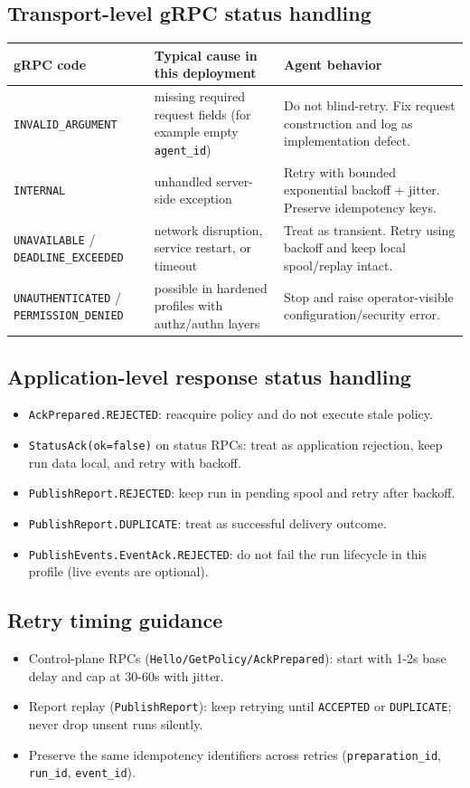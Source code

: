\documentclass[11pt,a4paper]{article}
\begin{document}
\subsection{Transport-level gRPC status handling}
\begin{longtable}{p{3.4cm}p{5.0cm}p{4.8cm}}
\textbf{gRPC code} & \textbf{Typical cause in this deployment} & \textbf{Agent behavior} \\
\hline
\endhead
\texttt{INVALID\_ARGUMENT} & missing required request fields (for example empty \texttt{agent\_id}) &
Do not blind-retry. Fix request construction and log as implementation defect. \\
\texttt{INTERNAL} & unhandled server-side exception &
Retry with bounded exponential backoff + jitter. Preserve idempotency keys. \\
\texttt{UNAVAILABLE} / \texttt{DEADLINE\_EXCEEDED} &
network disruption, service restart, or timeout &
Treat as transient. Retry using backoff and keep local spool/replay intact. \\
\texttt{UNAUTHENTICATED} / \texttt{PERMISSION\_DENIED} &
possible in hardened profiles with authz/authn layers &
Stop and raise operator-visible configuration/security error. \\
\hline
\end{longtable}

\subsection{Application-level response status handling}
\begin{itemize}
  \item \texttt{AckPrepared.REJECTED}: reacquire policy and do not execute stale policy.
  \item \texttt{StatusAck(ok=false)} on status RPCs: treat as application rejection, keep run data local, and retry with backoff.
  \item \texttt{PublishReport.REJECTED}: keep run in pending spool and retry after backoff.
  \item \texttt{PublishReport.DUPLICATE}: treat as successful delivery outcome.
  \item \texttt{PublishEvents.EventAck.REJECTED}: do not fail the run lifecycle in this profile (live events are optional).
\end{itemize}

\subsection{Retry timing guidance}
\begin{itemize}
  \item Control-plane RPCs (\texttt{Hello/GetPolicy/AckPrepared}): start with 1-2s base delay and cap at 30-60s with jitter.
  \item Report replay (\texttt{PublishReport}): keep retrying until \texttt{ACCEPTED} or \texttt{DUPLICATE}; never drop unsent runs silently.
  \item Preserve the same idempotency identifiers across retries (\texttt{preparation\_id}, \texttt{run\_id}, \texttt{event\_id}).
\end{itemize}
\end{document}
